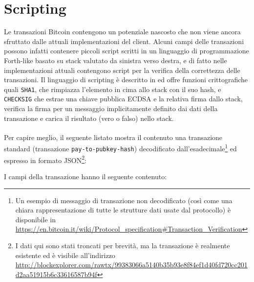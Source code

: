 \chapter{Scripting}\label{transaction-scripting}

Le transazioni Bitcoin contengono un potenziale nascosto che non viene ancora sfruttato dalle attuali implementazioni del client.
Alcuni campi delle transazioni possono infatti contenere piccoli script scritti in un linguaggio di programmazione Forth-like basato su stack valutato da sinistra verso destra, e di fatto nelle implementazioni attuali contengono script per la verifica della correttezza delle transazioni. Il linguaggio di scripting è descritto in \cite{bitcoin-scripting-api} ed offre funzioni crittografiche quali \verb|SHA1|, che rimpiazza l'elemento in cima allo stack con il suo hash, e \verb|CHECKSIG| che estrae una chiave pubblica ECDSA e la relativa firma dallo stack, verifica la firma per un messaggio implicitamente definito dai dati della transazione e carica il risultato (vero o falso) nello stack.\\\\
Per capire meglio, il seguente listato mostra il contenuto una transazione standard (transazione \verb|pay-to-pubkey-hash|) decodificato dall'esadecimale\footnote{Un esempio di messaggio di transazione non decodificato (così come una chiara rappresentazione di tutte le strutture dati usate dal protocollo) è disponibile in \url{https://en.bitcoin.it/wiki/Protocol_specification\#Transaction_Verification} } ed espresso in formato JSON\footnote{I dati qui sono stati troncati per brevità, ma la transazione è realmente esistente ed è visibile all'indirizzo \url{http://blockexplorer.com/rawtx/99383066a5140b35b93e8f84ef1d40fd720cc201d2aa51915b6c33616587b94f}}:



I campi della transazione hanno il seguente contenuto:

